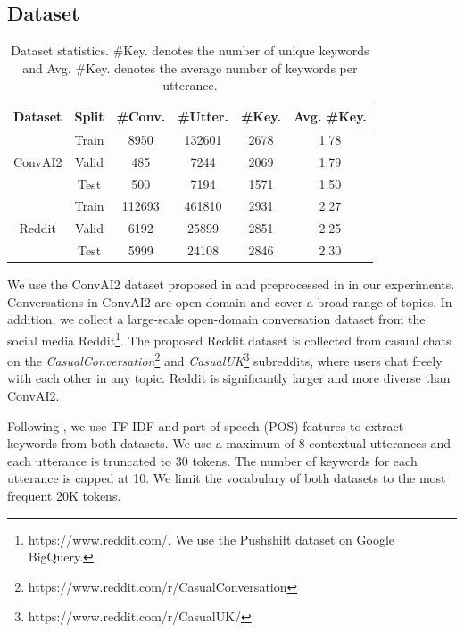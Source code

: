 \documentclass[letterpaper]{article} %
\begin{document}
\subsection{Dataset}
\label{sec: dataset}
\begin{table}[!t]
\small
\centering
\begin{tabular}{cccccc}
\hline
\textbf{Dataset} & \textbf{Split} & \textbf{\#Conv.} & \textbf{\#Utter.} & \textbf{\#Key.} & \textbf{Avg. \#Key.}\\
\hline
\multirow{3}{*}{ConvAI2} & Train & 8950 & 132601 & 2678 & 1.78\\
& Valid & 485 & 7244 & 2069 & 1.79\\
& Test & 500 & 7194 & 1571 & 1.50\\
\hline
\multirow{3}{*}{Reddit} & Train & 112693 & 461810 & 2931 & 2.27\\
& Valid & 6192 & 25899 & 2851 & 2.25\\
& Test & 5999 & 24108 & 2846 & 2.30\\
\hline
\end{tabular}
\caption{Dataset statistics. \#Key. denotes the number of unique keywords and Avg. \#Key. denotes the average number of keywords per utterance.}
\label{table: dataset}
\end{table}
We use the ConvAI2 dataset proposed in \cite{zhang2018personalizing,dinan2019second} and preprocessed in \cite{tang2019target} in our experiments. Conversations in ConvAI2 are open-domain and cover a broad range of topics. In addition, we collect a large-scale open-domain conversation dataset from the social media Reddit\footnote{https://www.reddit.com/. We use the Pushshift dataset on Google BigQuery.}. The proposed Reddit dataset is collected from casual chats on the \textit{CasualConversation}\footnote{https://www.reddit.com/r/CasualConversation} and \textit{CasualUK}\footnote{https://www.reddit.com/r/CasualUK/} subreddits, where users chat freely with each other in any topic. Reddit is significantly larger and more diverse than ConvAI2.

Following \cite{tang2019target}, we use TF-IDF and part-of-speech (POS) features to extract keywords from both datasets. We use a maximum of 8 contextual utterances and each utterance is truncated to 30 tokens. The number of keywords for each utterance is capped at 10. We limit the vocabulary of both datasets to the most frequent 20K tokens.
\end{document}
